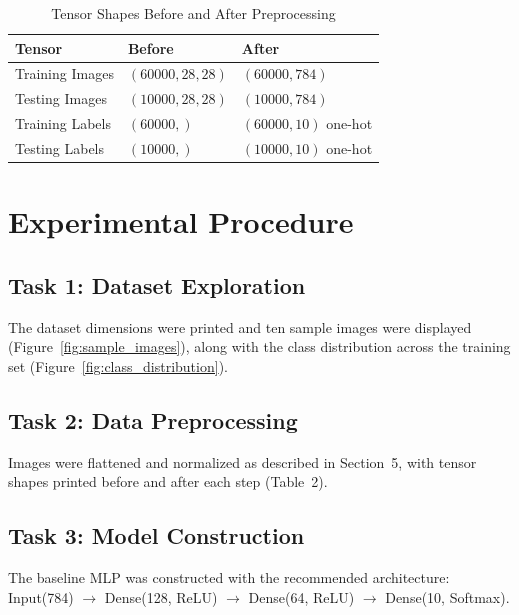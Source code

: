 \documentclass[11pt]{article}
\begin{document}
\begin{table}[H]
\centering
\caption{Tensor Shapes Before and After Preprocessing}
\begin{tabular}{@{}lll@{}}
\toprule
\textbf{Tensor} & \textbf{Before} & \textbf{After} \\
\midrule
Training Images & $(60000, 28, 28)$ & $(60000, 784)$ \\
Testing Images  & $(10000, 28, 28)$ & $(10000, 784)$ \\
Training Labels & $(60000,)$        & $(60000, 10)$ one-hot \\
Testing Labels  & $(10000,)$        & $(10000, 10)$ one-hot \\
\bottomrule
\end{tabular}
\end{table}

\section{Experimental Procedure}

\subsection*{Task 1: Dataset Exploration}
The dataset dimensions were printed and ten sample images were displayed
(Figure~\ref{fig:sample_images}), along with the class distribution across the
training set (Figure~\ref{fig:class_distribution}).

\subsection*{Task 2: Data Preprocessing}
Images were flattened and normalized as described in Section~5, with tensor
shapes printed before and after each step (Table~2).

\subsection*{Task 3: Model Construction}
The baseline MLP was constructed with the recommended architecture:\\
Input(784) $\rightarrow$ Dense(128, ReLU) $\rightarrow$ Dense(64, ReLU) $\rightarrow$ Dense(10, Softmax).
\end{document}
